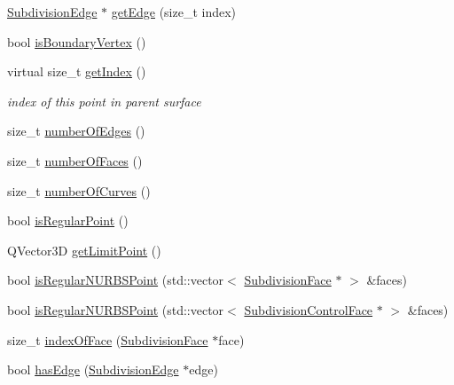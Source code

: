 \begin{DoxyCompactItemize}
\item 
\hyperlink{classShipCAD_1_1SubdivisionEdge}{Subdivision\-Edge} $\ast$ \hyperlink{classShipCAD_1_1SubdivisionPoint_a518c4e3dc5de74950c87ff0f733716ba}{get\-Edge} (size\-\_\-t index)
\item 
bool \hyperlink{classShipCAD_1_1SubdivisionPoint_afbcf1244015a92be04faed20163699f7}{is\-Boundary\-Vertex} ()
\item 
virtual size\-\_\-t \hyperlink{classShipCAD_1_1SubdivisionPoint_a8406682549c10ec9e1a184132f6ed2f0}{get\-Index} ()
\begin{DoxyCompactList}\small\item\em index of this point in parent surface \end{DoxyCompactList}\item 
size\-\_\-t \hyperlink{classShipCAD_1_1SubdivisionPoint_a0bc218bf0b1982a6d622535c2653200e}{number\-Of\-Edges} ()
\item 
size\-\_\-t \hyperlink{classShipCAD_1_1SubdivisionPoint_aac07ee9bc037a35a244ab179cf7bd344}{number\-Of\-Faces} ()
\item 
size\-\_\-t \hyperlink{classShipCAD_1_1SubdivisionPoint_afc9659ec83083e7725ce14a12a74d2f0}{number\-Of\-Curves} ()
\item 
bool \hyperlink{classShipCAD_1_1SubdivisionPoint_a6a0b4b628563cda2b2979ce6222e8a20}{is\-Regular\-Point} ()
\item 
Q\-Vector3\-D \hyperlink{classShipCAD_1_1SubdivisionPoint_a0eb743069fe2ee2e99cdf7417b2400d5}{get\-Limit\-Point} ()
\item 
bool \hyperlink{classShipCAD_1_1SubdivisionPoint_a88243019864c79766266cee627671183}{is\-Regular\-N\-U\-R\-B\-S\-Point} (std\-::vector$<$ \hyperlink{classShipCAD_1_1SubdivisionFace}{Subdivision\-Face} $\ast$ $>$ \&faces)
\item 
bool \hyperlink{classShipCAD_1_1SubdivisionPoint_ac1fca0520d34576a1145f3691eca7595}{is\-Regular\-N\-U\-R\-B\-S\-Point} (std\-::vector$<$ \hyperlink{classShipCAD_1_1SubdivisionControlFace}{Subdivision\-Control\-Face} $\ast$ $>$ \&faces)
\item 
size\-\_\-t \hyperlink{classShipCAD_1_1SubdivisionPoint_a354475f80700fee46dcb46f8602c5345}{index\-Of\-Face} (\hyperlink{classShipCAD_1_1SubdivisionFace}{Subdivision\-Face} $\ast$face)
\item 
bool \hyperlink{classShipCAD_1_1SubdivisionPoint_ada0d082be616958c024bb1743d392e2f}{has\-Edge} (\hyperlink{classShipCAD_1_1SubdivisionEdge}{Subdivision\-Edge} $\ast$edge)
\item 

\end{DoxyCompactItemize}
